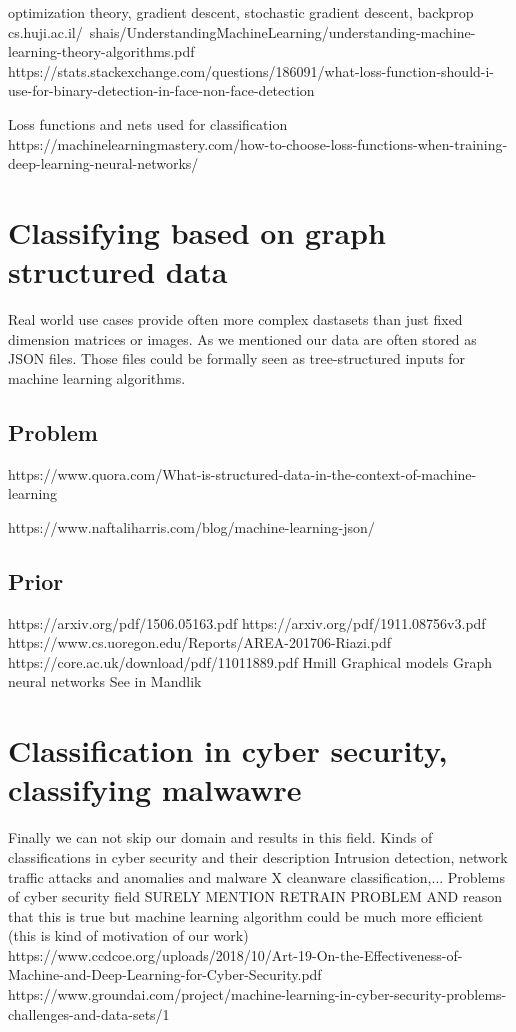 optimization theory, gradient descent, stochastic gradient descent, backprop
cs.huji.ac.il/~shais/UnderstandingMachineLearning/understanding-machine-learning-theory-algorithms.pdf
https://stats.stackexchange.com/questions/186091/what-loss-function-should-i-use-for-binary-detection-in-face-non-face-detection

Loss functions and nets used for classification
https://machinelearningmastery.com/how-to-choose-loss-functions-when-training-deep-learning-neural-networks/

\section{Classifying based on graph structured data}
Real world use cases provide often more complex dastasets than just fixed dimension matrices or images. As we mentioned our data are often stored as JSON files. Those files could be formally seen as tree-structured inputs for machine learning algorithms. 
\subsection{Problem}
https://www.quora.com/What-is-structured-data-in-the-context-of-machine-learning

https://www.naftaliharris.com/blog/machine-learning-json/

\subsection{Prior}
https://arxiv.org/pdf/1506.05163.pdf
https://arxiv.org/pdf/1911.08756v3.pdf
https://www.cs.uoregon.edu/Reports/AREA-201706-Riazi.pdf
https://core.ac.uk/download/pdf/11011889.pdf
Hmill
Graphical models
Graph neural networks
See in Mandlik

\section{Classification in cyber security, classifying malwawre}
Finally we can not skip our domain and results in this field. 
Kinds of classifications in cyber security and their description
Intrusion detection, network traffic attacks and anomalies and malware X cleanware classification,...
Problems of cyber security field
SURELY MENTION RETRAIN PROBLEM AND reason that this is true but machine learning algorithm could be much more efficient (this is kind of motivation of our work)
https://www.ccdcoe.org/uploads/2018/10/Art-19-On-the-Effectiveness-of-Machine-and-Deep-Learning-for-Cyber-Security.pdf
https://www.groundai.com/project/machine-learning-in-cyber-security-problems-challenges-and-data-sets/1

